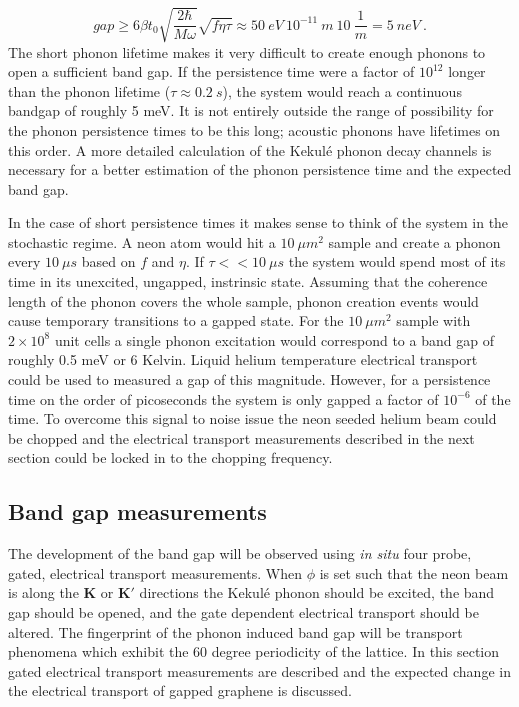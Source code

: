 \begin{equation*}
	gap \geq 6 \beta t_0 \sqrt{\frac{2 \hbar}{M \omega}}\sqrt{f \eta \tau} \approx 50 \ eV \ 10^{-11} \ m \ 10 \ \frac{1}{m}
	= 5 \ neV \ .
\end{equation*}
The short phonon lifetime makes it very difficult to create enough phonons to open a sufficient band gap.
If the persistence time were a factor of $10^12$ longer than the phonon lifetime ($\tau \approx 0.2 \ s$), the system would reach a continuous bandgap of roughly 5 meV.
It is not entirely outside the range of possibility for the phonon persistence times to be this long; acoustic phonons have lifetimes on this order.
A more detailed calculation of the Kekul\'e phonon decay channels is necessary for a better estimation of the phonon persistence time and the expected band gap.

In the case of short persistence times it makes sense to think of the system in the stochastic regime.
A neon atom would hit a $10 \ \mu m^2$ sample and create a phonon every $10 \ \mu s$ based on $f$ and $\eta$.
If $\tau << 10 \ \mu s$ the system would spend most of its time in its unexcited, ungapped, instrinsic state.
Assuming that the coherence length of the phonon covers the whole sample, phonon creation events would cause temporary transitions to a gapped state.
For the $10 \ \mu m^2$ sample with $2 \times 10^8$ unit cells a single phonon excitation would correspond to a band gap of roughly 0.5 meV or 6 Kelvin.
Liquid helium temperature electrical transport could be used to measured a gap of this magnitude.
However, for a persistence time on the order of picoseconds the system is only gapped a factor of $10^{-6}$ of the time.
To overcome this signal to noise issue the neon seeded helium beam could be chopped and the electrical transport measurements described in the next section could be locked in to the chopping frequency.

\subsection{Band gap measurements}
The development of the band gap will be observed using \textit{in situ} four probe, gated, electrical transport measurements.
When $\phi$ is set such that the neon beam is along the $\bm{K}$ or $\bm{K'}$ directions the Kekul\'e phonon should be excited, the band gap should be opened, and the gate dependent electrical transport should be altered.
The fingerprint of the phonon induced band gap will be transport phenomena which exhibit the 60 degree periodicity of the lattice.
In this section gated electrical transport measurements are described and the expected change in the electrical transport of gapped graphene is discussed.

